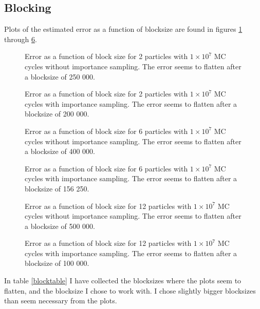 \documentclass[a4paper,English,10pt]{article}
\begin{document}
\subsection{Blocking}
Plots of the estimated error as a function of blocksize are found in figures \ref{figblock2pJ} through \ref{figblock12pIsJ}.
\begin{figure}
  \begin{center}
  \end{center}
  \caption{Error as a function of block size for 2 particles with $1\times10^7$ MC cycles without importance sampling.
  The error seems to flatten after a blocksize of 250 000.}\label{figblock2pJ}
\end{figure}
\begin{figure}
  \begin{center}
  \end{center}
  \caption{Error as a function of block size for 2 particles with $1\times10^7$ MC cycles with importance sampling.
   The error seems to flatten after a blocksize of 200 000.}\label{figblock2pIsJ}
\end{figure}
\begin{figure}
  \begin{center}
  \end{center}
  \caption{Error as a function of block size for 6 particles with $1\times10^7$ MC cycles without importance sampling.
 The error seems to flatten after a blocksize of 400 000. }\label{figblock6pJ}
\end{figure}
\begin{figure}
  \begin{center}
  \end{center}
  \caption{Error as a function of block size for 6 particles with $1\times10^7$ MC cycles with importance sampling.
  The error seems to flatten after a blocksize of 156 250.}\label{figblock6pIsJ}
\end{figure}
\begin{figure}
  \begin{center}
  \end{center}
  \caption{Error as a function of block size for 12 particles with $1\times10^7$ MC cycles without importance sampling.
  The error seems to flatten after a blocksize of 500 000.}\label{figblock12pJ}
\end{figure}
\begin{figure}
  \begin{center}
  \end{center}
  \caption{Error as a function of block size for 12 particles with $1\times10^7$ MC cycles with importance sampling.
  The error seems to flatten after a blocksize of 100 000.}\label{figblock12pIsJ}
\end{figure}
In table \ref{blocktable} I have collected the blocksizes where the plots seem to flatten, and the blocksize I chose to work with.
I chose slightly bigger blocksizes than seem necessary from the plots.
\end{document}
